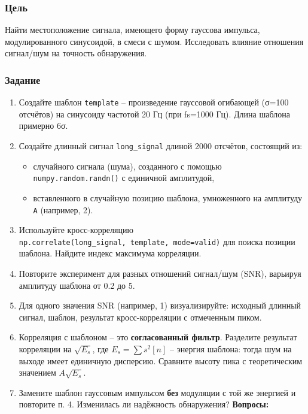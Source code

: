 \documentclass[12pt,a4paper,openany]{book}
\providecommand{\tightlist}{\setlength{\itemsep}{0pt}\setlength{\parskip}{0pt}}
\begin{document}
\subsubsection*{Цель}

Найти местоположение сигнала, имеющего форму гауссова импульса, модулированного синусоидой, в смеси с шумом. Исследовать влияние отношения сигнал/шум на точность обнаружения.

\subsubsection*{Задание}

\begin{enumerate}
\def\labelenumi{\arabic{enumi}.}
\tightlist
\item
  Создайте шаблон \texttt{template} -- произведение гауссовой огибающей (σ=100 отсчётов) на синусоиду частотой 20 Гц (при fs=1000 Гц). Длина шаблона примерно 6σ.
\item
  Создайте длинный сигнал \texttt{long\_\allowbreak{}signal} длиной 2000 отсчётов, состоящий из:

  \begin{itemize}
  \tightlist
  \item
    случайного сигнала (шума), созданного с помощью \texttt{numpy.\allowbreak{}random.\allowbreak{}randn(\allowbreak{})} с единичной амплитудой,
  \item
    вставленного в случайную позицию шаблона, умноженного на амплитуду \texttt{A} (например, 2).
  \end{itemize}
\item
  Используйте кросс-корреляцию \texttt{np.\allowbreak{}correlate(\allowbreak{}long\_\allowbreak{}signal,\allowbreak{}\ template,\allowbreak{}\ mode=\allowbreak{}\textquotesingle{}\allowbreak{}valid\textquotesingle{}\allowbreak{})} для поиска позиции шаблона. Найдите индекс максимума корреляции.
\item
  Повторите эксперимент для разных отношений сигнал/шум (SNR), варьируя амплитуду шаблона от 0.2 до 5.
\item
  Для одного значения SNR (например, 1) визуализируйте: исходный длинный сигнал, шаблон, результат кросс-корреляции с отмеченным пиком.
\item
  Корреляция с шаблоном -- это \textbf{согласованный фильтр}. Разделите результат корреляции на \(\sqrt{E_s}\), где \(E_s = \sum s^2[n]\) -- энергия шаблона: тогда шум на выходе имеет единичную дисперсию. Сравните высоту пика с теоретическим значением \(A\sqrt{E_s}\).
\item
  Замените шаблон гауссовым импульсом \textbf{без} модуляции с той же энергией и повторите п. 4. Изменилась ли надёжность обнаружения?
  \textbf{Вопросы:}
\end{enumerate}
\end{document}
